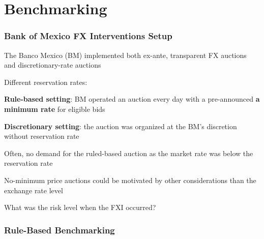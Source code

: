 \documentclass{beamer}
\newenvironment{largeitemize}{\itemize\addtolength{\itemsep}{10pt}}{\enditemize}
\begin{document}
\section{Benchmarking}

\begin{frame}
  \frametitle{Bank of Mexico FX Interventions Setup}  
  \begin{largeitemize}
    \item The Banco Mexico (BM) implemented both ex-ante, transparent FX
      auctions and discretionary-rate auctions
    \item Different reservation rates:
      \begin{largeitemize}
      \item \textbf{Rule-based setting}: BM operated an auction every day
        with a pre-announced \textbf{a minimum rate} for eligible bids
      \item \textbf{Discretionary setting}: the auction was organized at the BM's discretion without reservation rate
      \end{largeitemize}
  \item Often, no demand for the ruled-based auction as the market rate was
    below the reservation rate
  \item No-minimum price auctions could be motivated by other considerations
    than the exchange rate level
  \item What was the risk level when the FXI occurred?
  \end{largeitemize}
\end{frame}


\begin{frame}
  \frametitle{Rule-Based Benchmarking}
\end{frame}
\end{document}
